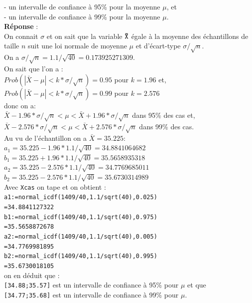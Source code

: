 \documentclass[a4paper,11pt]{book}
\begin{document}
- un intervalle de confiance \`a 95\% pour la moyenne $\mu$, et\\  
- un intervalle de confiance \`a 99\% pour la moyenne $\mu$.\\
{\bf R\'eponse} :\\
On connait $\sigma$ et on sait que la variable ${\tt \bar X}$ \'egale \`a
la moyenne des \'echantillons de taille $n$ suit une loi normale de  moyenne 
$\mu$ et d'\'ecart-type $\sigma/\sqrt n$.\\
On a $\sigma/\sqrt n=1.1/\sqrt{40}=0.173925271309$.\\
On sait que l'on a :\\
$Prob(|\bar X-\mu|<k*\sigma/\sqrt n)=0.95$ pour $k=1.96$ et,\\
$Prob(|\bar X-\mu|<k*\sigma/\sqrt n)=0.99$ pour $k=2.576$ \\
donc on a:\\ 
$\bar X-1.96*\sigma/\sqrt n<\mu<\bar X+1.96*\sigma/\sqrt n$ dans 95\% des cas et,\\
$\bar X-2.576*\sigma/\sqrt n<\mu<\bar X+2.576*\sigma/\sqrt n$ dans 99\% des cas.\\
Au vu de l'\'echantillon on a $\bar X=35.225$:\\
$a_1=35.225-1.96*1.1/\sqrt{40}=34.8841064682$\\
$b_1=35.225+1.96*1.1/\sqrt{40}=35.5658935318$\\
$a_2=35.225-2.576*1.1/\sqrt{40}=34.7769685011$\\
$b_2=35.225-2.576*1.1/\sqrt{40}= 35.6730314989$\\
Avec {\tt Xcas} on tape et on obtient :\\
{\tt a1:=normal\_icdf(1409/40,1.1/sqrt(40),0.025)}\\
 {\tt =34.8841127322}\\
{\tt b1:=normal\_icdf(1409/40,1.1/sqrt(40),0.975)}\\
{\tt =35.5658872678}\\
{\tt a2:=normal\_icdf(1409/40,1.1/sqrt(40),0.005)}\\
{\tt =34.7769981895}\\
{\tt b2:=normal\_icdf(1409/40,1.1/sqrt(40),0.995)}\\
{\tt =35.6730018105}\\
 on en d\'eduit que :\\
{\tt [34.88;35.57]} est un intervalle de confiance \`a 95\% pour $\mu$ et que \\
{\tt [34.77;35.68]} est un intervalle de confiance \`a 99\% pour $\mu$. \\
\end{document}

